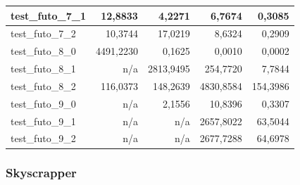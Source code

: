 \documentclass{article}
\begin{document}
\begin{table}[H]
\begin{center}
\begin{tabular}{|l|r|r|r|r|}
				test\_futo\_7\_1 & 12,8833                          & 4,2271                           & 6,7674                                 & 0,3085                                 \\ \hline
				test\_futo\_7\_2 & 10,3744                          & 17,0219                          & 8,6324                                 & 0,2909                                 \\ \hline
				test\_futo\_8\_0 & 4491,2230                        & 0,1625                           & 0,0010                                 & 0,0002                                 \\ \hline
				test\_futo\_8\_1 & n/a                              & 2813,9495                        & 254,7720                               & 7,7844                                 \\ \hline
				test\_futo\_8\_2 & 116,0373                         & 148,2639                         & 4830,8584                              & 154,3986                               \\ \hline
				test\_futo\_9\_0 & n/a                              & 2,1556                           & 10,8396                                & 0,3307                                 \\ \hline
				test\_futo\_9\_1 & n/a                              & n/a                              & 2657,8022                              & 63,5044                                \\ \hline
				test\_futo\_9\_2 & n/a                              & n/a                              & 2677,7288                              & 64,6978                                \\ \hline
			\end{tabular}
		\end{center}
	\end{table}
	
	\subsubsection{Skyscrapper}
	
\end{document}
